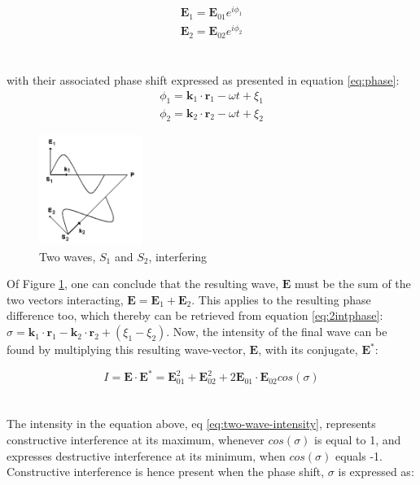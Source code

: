 \begin{equation}
    \begin{split}
    \textbf{E}_1 = \textbf{E}_{01} e^{i \phi_1}\\ %
    \textbf{E}_2 = \textbf{E}_{02} e^{i \phi_2}
    \end{split}
    \label{eq:2int}
\end{equation}
\\\\
with their associated phase shift expressed as presented in equation \ref{eq:phase}:
\begin{equation}
    \begin{split}
    \phi_1 = \textbf{k}_1\cdot \textbf{r}_1 - \omega t + \xi_1\\
    \phi_2 = \textbf{k}_2\cdot \textbf{r}_2 - \omega t + \xi_2
    \end{split}
    \label{eq:2intphase}
\end{equation}
\begin{figure}[h]
  \centering
    \includegraphics[width=0.3\textwidth]{Images/theory/interference.png}
    \caption{Two waves, $S_1$ and $S_2$, interfering}
    \label{fig:interference}
\end{figure}
Of Figure \ref{fig:interference}, one can conclude that the resulting wave, $\textbf{E}$ must be the sum of the two vectors interacting, $\textbf{E} = \textbf{E}_1 + \textbf{E}_2$. This applies to the resulting phase difference too, which thereby can be retrieved from equation \ref{eq:2intphase}: $\sigma = \textbf{k}_1\cdot \textbf{r}_1 - \textbf{k}_2\cdot \textbf{r}_2 + (\xi_1 - \xi_2)$. Now, the intensity of the final wave can be found by multiplying this resulting wave-vector, $\textbf{E}$, with its conjugate, $\textbf{E}^*$: 

\begin{equation}
    I = \textbf{E} \cdot \textbf{E}^* = \textbf{E}_{01}^2 + \textbf{E}_{02}^2 + 2\textbf{E}_{01}\cdot \textbf{E}_{02} cos(\sigma)
    \label{eq:two-wave-intensity}
\end{equation}
\\\\
The intensity in the equation above, eq \ref{eq:two-wave-intensity}, represents constructive interference at its maximum, whenever $cos(\sigma)$ is equal to 1, and expresses destructive interference at its minimum, when $cos(\sigma)$ equals -1. Constructive interference is hence present when the phase shift, $\sigma$ is expressed as:


